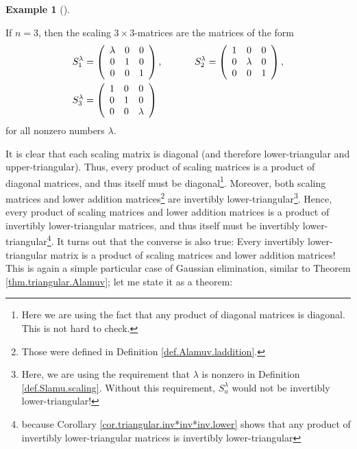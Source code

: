 \documentclass[numbers=enddot,12pt,final,onecolumn,notitlepage]{scrartcl}%
\theoremstyle{definition}
\newtheorem{exam}[theo]{Example}
\newenvironment{example}[1][]
{\begin{exam}[#1]\begin{leftbar}}
{\end{leftbar}\end{exam}}
\begin{document}
\begin{example}
If $n=3$, then the scaling $3\times3$-matrices are the matrices of the form%
\begin{align*}
S_{1}^{\lambda}  &  =\left(
\begin{array}
[c]{ccc}%
\lambda & 0 & 0\\
0 & 1 & 0\\
0 & 0 & 1
\end{array}
\right)  ,\ \ \ \ \ \ \ \ \ \ S_{2}^{\lambda}=\left(
\begin{array}
[c]{ccc}%
1 & 0 & 0\\
0 & \lambda & 0\\
0 & 0 & 1
\end{array}
\right)  ,\\
S_{3}^{\lambda}  &  =\left(
\begin{array}
[c]{ccc}%
1 & 0 & 0\\
0 & 1 & 0\\
0 & 0 & \lambda
\end{array}
\right)
\end{align*}
for all nonzero numbers $\lambda$.
\end{example}

It is clear that each scaling matrix is diagonal (and therefore
lower-triangular and upper-triangular). Thus, every product of scaling
matrices is a product of diagonal matrices, and thus itself must be
diagonal\footnote{Here we are using the fact that any product of diagonal
matrices is diagonal. This is not hard to check.}. Moreover, both scaling
matrices and lower addition matrices\footnote{Those were defined in Definition
\ref{def.Alamuv.laddition}.} are invertibly lower-triangular\footnote{Here, we
are using the requirement that $\lambda$ is nonzero in Definition
\ref{def.Slamu.scaling}. Without this requirement, $S_{u}^{\lambda}$ would not
be invertibly lower-triangular!}. Hence, every product of scaling matrices and
lower addition matrices is a product of invertibly lower-triangular matrices,
and thus itself must be invertibly lower-triangular\footnote{because Corollary
\ref{cor.triangular.inv*inv*inv.lower} shows that any product of invertibly
lower-triangular matrices is invertibly lower-triangular}. It turns out that
the converse is also true: Every invertibly lower-triangular matrix is a
product of scaling matrices and lower addition matrices! This is again a
simple particular case of Gaussian elimination, similar to Theorem
\ref{thm.triangular.Alamuv}; let me state it as a theorem:
\end{document}
